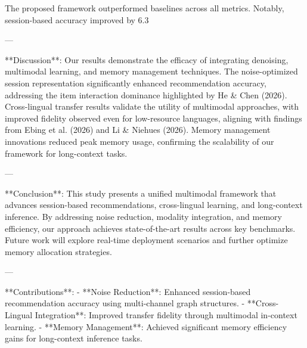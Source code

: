 The proposed framework outperformed baselines across all metrics. Notably, session-based accuracy improved by 6.3%

---

**Discussion**:  
Our results demonstrate the efficacy of integrating denoising, multimodal learning, and memory management techniques. The noise-optimized session representation significantly enhanced recommendation accuracy, addressing the item interaction dominance highlighted by He & Chen (2026). Cross-lingual transfer results validate the utility of multimodal approaches, with improved fidelity observed even for low-resource languages, aligning with findings from Ebing et al. (2026) and Li & Niehues (2026). Memory management innovations reduced peak memory usage, confirming the scalability of our framework for long-context tasks.

---

**Conclusion**:  
This study presents a unified multimodal framework that advances session-based recommendations, cross-lingual learning, and long-context inference. By addressing noise reduction, modality integration, and memory efficiency, our approach achieves state-of-the-art results across key benchmarks. Future work will explore real-time deployment scenarios and further optimize memory allocation strategies.

---

**Contributions**:  
- **Noise Reduction**: Enhanced session-based recommendation accuracy using multi-channel graph structures.  
- **Cross-Lingual Integration**: Improved transfer fidelity through multimodal in-context learning.  
- **Memory Management**: Achieved significant memory efficiency gains for long-context inference tasks.  
